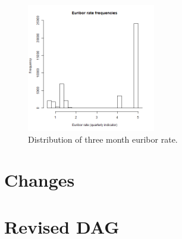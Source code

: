 \documentclass[11pt]{article}
\begin{document}
\begin{figure}[h]
	\centering
	\includegraphics[width=0.5\textwidth]{images/euribor3m}
	\caption{Distribution of three month euribor rate.}
	\label{fig:euribor3m}
\end{figure}
\section{Changes}
\section{Revised DAG}
\end{document}
